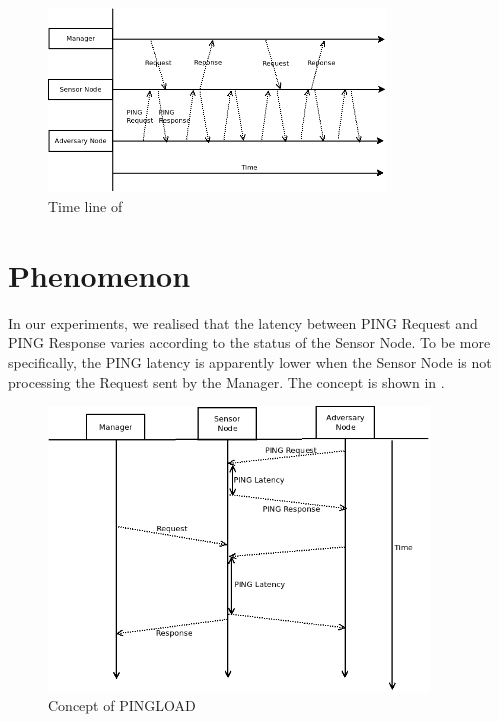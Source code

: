 \begin{figure}[h!]
	\center
	\includegraphics[width=0.8\textwidth]{fig/PINGLOAD_time.png}
	\caption{Time line of }
	\label{Fig: Time line of PINGLOAD}
\end{figure}

\section{Phenomenon}

In our experiments, we realised that the latency between PING Request and PING Response varies according to the status of the Sensor Node. To be more specifically, the PING latency is apparently lower when the Sensor Node is not processing the Request sent by the Manager. The concept is shown in . 

\begin{figure}[h!]
	\center
	\includegraphics[width=0.9\textwidth]{fig/PINGLOAD_concept.png}
	\caption{Concept of PINGLOAD}
	\label{Fig: Concept of PINGLOAD}
\end{figure}

